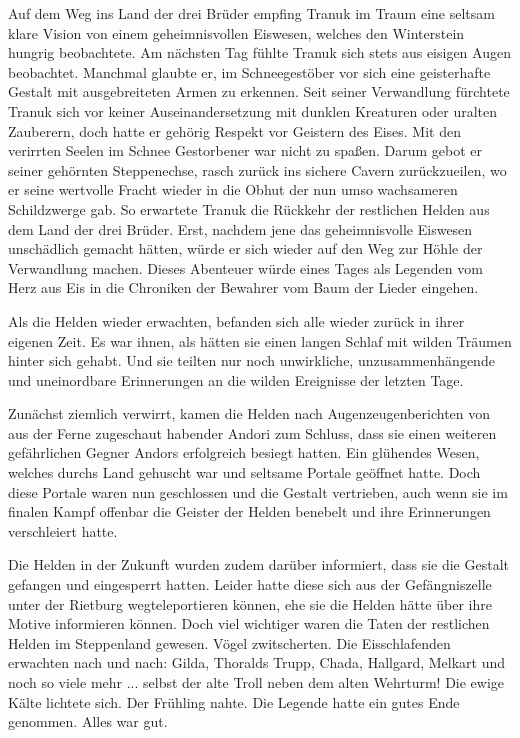Auf dem Weg ins Land der drei Brüder empfing Tranuk im Traum eine seltsam klare Vision von einem geheimnisvollen Eiswesen, welches den Winterstein hungrig beobachtete. Am nächsten Tag fühlte Tranuk sich stets aus eisigen Augen beobachtet. Manchmal glaubte er, im Schneegestöber vor sich eine geisterhafte Gestalt mit ausgebreiteten Armen zu erkennen. Seit seiner Verwandlung fürchtete Tranuk sich vor keiner Auseinandersetzung mit dunklen Kreaturen oder uralten Zauberern, doch hatte er gehörig Respekt vor Geistern des Eises. Mit den verirrten Seelen im Schnee Gestorbener war nicht zu spaßen. Darum gebot er seiner gehörnten Steppenechse, rasch zurück ins sichere Cavern zurückzueilen, wo er seine wertvolle Fracht wieder in die Obhut der nun umso wachsameren Schildzwerge gab. So erwartete Tranuk die Rückkehr der restlichen Helden aus dem Land der drei Brüder. Erst, nachdem jene das geheimnisvolle Eiswesen unschädlich gemacht hätten, würde er sich wieder auf den Weg zur Höhle der Verwandlung machen. Dieses Abenteuer würde eines Tages als Legenden vom Herz aus Eis in die Chroniken der Bewahrer vom Baum der Lieder eingehen.



\trennzeichen



Als die Helden wieder erwachten, befanden sich alle wieder zurück in ihrer eigenen Zeit. Es war ihnen, als hätten sie einen langen Schlaf mit wilden Träumen hinter sich gehabt. Und sie teilten nur noch unwirkliche, unzusammenhängende und uneinordbare Erinnerungen an die wilden Ereignisse der letzten Tage. 

Zunächst ziemlich verwirrt, kamen die Helden nach Augenzeugenberichten von aus der Ferne zugeschaut habender Andori zum Schluss, dass sie einen weiteren gefährlichen Gegner Andors erfolgreich besiegt hatten. Ein glühendes Wesen, welches durchs Land gehuscht war und seltsame Portale geöffnet hatte. Doch diese Portale waren nun geschlossen und die Gestalt vertrieben, auch wenn sie im finalen Kampf offenbar die Geister der Helden benebelt und ihre Erinnerungen verschleiert hatte. 

Die Helden in der Zukunft wurden zudem darüber informiert, dass sie die Gestalt gefangen und eingesperrt hatten. Leider hatte diese sich aus der Gefängniszelle unter der Rietburg wegteleportieren können, ehe sie die Helden hätte über ihre Motive informieren können. Doch viel wichtiger waren die Taten der restlichen Helden im Steppenland gewesen. Vögel zwitscherten. Die Eisschlafenden erwachten nach und nach: Gilda, Thoralds Trupp, Chada, Hallgard, Melkart und noch so viele mehr ... selbst der alte Troll neben dem alten Wehrturm! Die ewige Kälte lichtete sich. Der Frühling nahte. Die Legende hatte ein gutes Ende genommen. Alles war gut. 

